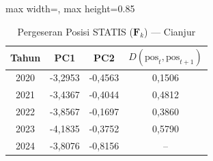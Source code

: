 \begin{table}[H]
\centering
\caption{Pergeseran Posisi STATIS ($\mathbf{F}_k$) --- Cianjur} \label{tab:app1jarak_statis_skor_cianjur}
\begin{adjustbox}{max width=\textwidth, max height=0.85\textheight}
\begin{tabular}{|c|c|c|c|}
\hline
\textbf{Tahun} & \textbf{PC1} & \textbf{PC2} & \textbf{$D(\text{pos}_t, \text{pos}_{t+1})$} \\
\hline
2020 & -3,2953 & -0,4563 & 0,1506 \\
2021 & -3,4367 & -0,4044 & 0,4812 \\
2022 & -3,8567 & -0,1697 & 0,3860 \\
2023 & -4,1835 & -0,3752 & 0,5790 \\
2024 & -3,8076 & -0,8156 & -- \\
\hline
\end{tabular}
\end{adjustbox}
\end{table}
